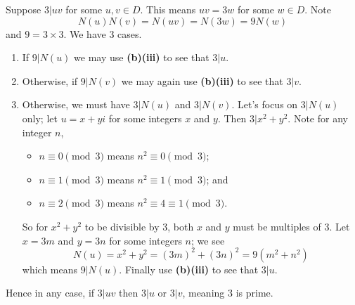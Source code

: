 \begin{questions}
\begin{partquestions}{\alph*}
\begin{partquestions}{\roman*}
            \item Suppose $3 \vert uv$ for some $u,v\in D$. This means $uv = 3w$ for some $w \in D$. Note
            \[
                N(u)N(v) = N(uv) = N(3w) = 9N(w)
            \]
            and $9 = 3\times3$. We have 3 cases.
            \begin{enumerate}[label=\arabic*.]
                \item If $9 \vert N(u)$ we may use \textbf{(b)(iii)} to see that $3 \vert u$.
                \item Otherwise, if $9 \vert N(v)$ we may again use \textbf{(b)(iii)} to see that $3 \vert v$.
                \item Otherwise, we must have $3 \vert N(u)$ and $3 \vert N(v)$. Let's focus on $3 \vert N(u)$ only; let $u = x+yi$ for some integers $x$ and $y$. Then $3 \vert x^2+y^2$. Note for any integer $n$,
                \begin{itemize}
                    \item $n \equiv 0 \pmod3$ means $n^2 \equiv 0 \pmod3$;
                    \item $n \equiv 1 \pmod3$ means $n^2 \equiv 1 \pmod3$; and
                    \item $n \equiv 2 \pmod3$ means $n^2 \equiv 4 \equiv 1 \pmod3$.
                \end{itemize}
                So for $x^2+y^2$ to be divisible by 3, both $x$ and $y$ must be multiples of 3. Let $x = 3m$ and $y = 3n$ for some integers $n$; we see
                \[
                    N(u) = x^2+y^2 = (3m)^2 + (3n)^2 = 9(m^2+n^2)
                \]
                which means $9 \vert N(u)$. Finally use \textbf{(b)(iii)} to see that $3 \vert u$.
            \end{enumerate}
            Hence in any case, if $3 \vert uv$ then $3 \vert u$ or $3 \vert v$, meaning 3 is prime.
        \end{partquestions}
    \end{partquestions}


\end{questions}
